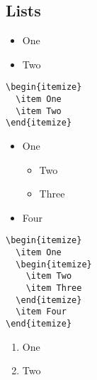 \documentclass[a4paper,11pt,fleqn]{book}
\begin{document}
\begin{enumerate}
\section{Lists}
\begin{multicols}{2}
  \begin{itemize}
    \item One
    \item Two
  \end{itemize}

  \vfill\null\columnbreak

  \begin{verbatim}
\begin{itemize}
  \item One
  \item Two
\end{itemize}
   \end{verbatim}
\end{multicols}

\begin{multicols}{2}
  \begin{itemize}
    \item One
    \begin{itemize}
      \item Two
      \item Three
    \end{itemize}
    \item Four
  \end{itemize}

  \vfill\null\columnbreak

  \begin{verbatim}
\begin{itemize}
  \item One
  \begin{itemize}
    \item Two
    \item Three
  \end{itemize}
  \item Four
\end{itemize}
  \end{verbatim}
\end{multicols}

\begin{multicols}{2}
  \begin{enumerate}
    \item One
    \item Two
  \end{enumerate}


\end{multicols}
\end{enumerate}
\end{document}
